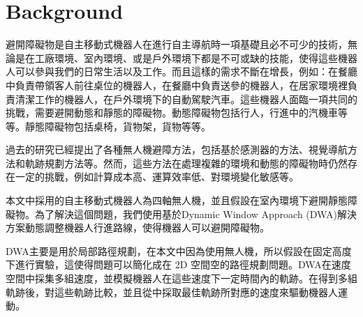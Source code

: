 \documentclass[crop=false]{standalone}
\begin{document}
	\section{Background}
	避開障礙物是自主移動式機器人在進行自主導航時一項基礎且必不可少的技術，無論是在工廠環境、室內環境、或是戶外環境下都是不可或缺的技能，使得這些機器人可以參與我們的日常生活以及工作。而且這樣的需求不斷在增長，例如：在餐廳中負責帶領客人前往桌位的機器人，在餐廳中負責送參的機器人，在居家環境裡負責清潔工作的機器人，在戶外環境下的自動駕駛汽車。這些機器人面臨一項共同的挑戰，需要避開動態和靜態的障礙物。動態障礙物包括行人，行進中的汽機車等等。靜態障礙物包括桌椅，貨物架，貨物等等。
	
	過去的研究已經提出了各種無人機避障方法，包括基於感測器的方法、視覺導航方法和軌跡規劃方法等。然而，這些方法在處理複雜的環境和動態的障礙物時仍然存在一定的挑戰，例如計算成本高、運算效率低、對環境變化敏感等。
	
	本文中採用的自主移動式機器人為四軸無人機，並且假設在室內環境下避開靜態障礙物。為了解決這個問題，我們使用基於Dynamic Window Approach (DWA)\cite{fox}解決方案動態調整機器人行進路線，使得機器人可以避開障礙物。
	
	DWA主要是用於局部路徑規劃，在本文中因為使用無人機，所以假設在固定高度下進行實驗，這使得問題可以簡化成在 2D 空間空的路徑規劃問題。DWA在速度空間中採集多組速度，並模擬機器人在這些速度下一定時間內的軌跡。在得到多組軌跡後，對這些軌跡比較，並且從中採取最佳軌跡所對應的速度來驅動機器人運動。
\end{document}
